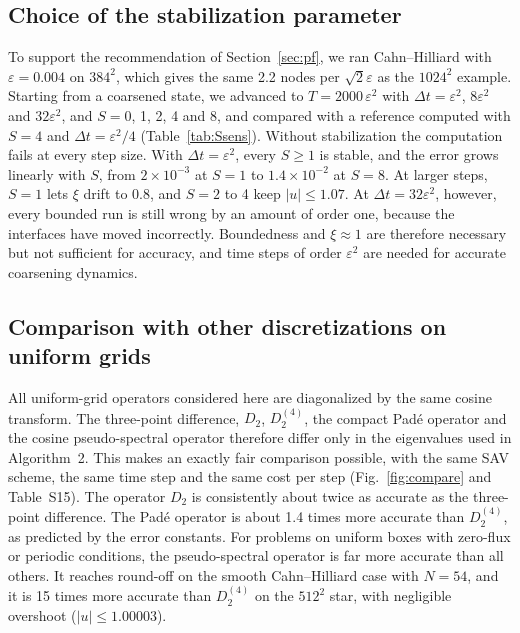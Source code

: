 \documentclass[preprint,12pt]{elsarticle}
\theoremstyle{remark}
\begin{document}
\subsection{Choice of the stabilization parameter}\label{sec:Sstudy}
To support the recommendation of Section~\ref{sec:pf}, we ran Cahn--Hilliard with $\varepsilon=0.004$ on
$384^2$, which gives the same 2.2 nodes per $\sqrt2\varepsilon$ as the $1024^2$ example. Starting from a
coarsened state, we advanced to $T=2000\,\varepsilon^2$ with $\Delta t=\varepsilon^2$, $8\varepsilon^2$ and
$32\varepsilon^2$, and $S=0$, 1, 2, 4 and 8, and compared with a reference computed with $S=4$ and
$\Delta t=\varepsilon^2/4$ (Table~\ref{tab:Ssens}). Without stabilization the computation fails at every step
size. With $\Delta t=\varepsilon^2$, every $S\ge1$ is stable, and the error grows linearly with $S$, from
$2\times10^{-3}$ at $S=1$ to $1.4\times10^{-2}$ at $S=8$. At larger steps, $S=1$ lets $\xi$ drift to 0.8, and
$S=2$ to 4 keep $|u|\le1.07$. At $\Delta t=32\varepsilon^2$, however, every bounded run is still wrong by an
amount of order one, because the interfaces have moved incorrectly. Boundedness and $\xi\approx1$ are
therefore necessary but not sufficient for accuracy, and time steps of order $\varepsilon^2$ are needed for
accurate coarsening dynamics.

\begin{table}[t]\centering\small
\caption{Sensitivity to the stabilization $S$ and the time step: largest $|u_h|$, error against the reference
at $T=2000\varepsilon^2$, and $\xi$ at $T$ ($\varepsilon=0.004$, $384^2$).}\label{tab:Ssens}

\end{table}

\subsection{Comparison with other discretizations on uniform grids}\label{sec:compare}
All uniform-grid operators considered here are diagonalized by the same cosine transform. The
three-point difference, $D_2$, $D_2^{(4)}$, the compact Pad\'e operator and the cosine pseudo-spectral
operator therefore differ only in the eigenvalues used in Algorithm~2. This makes an exactly fair
comparison possible, with the same SAV scheme, the same time step and the same cost per step
(Fig.~\ref{fig:compare} and Table~S15). The operator $D_2$ is consistently about twice as
accurate as the three-point difference. The Pad\'e operator is about 1.4 times more accurate than
$D_2^{(4)}$, as predicted by the error constants. For problems on uniform boxes with zero-flux or periodic
conditions, the pseudo-spectral operator is far more accurate than all others. It reaches round-off on the
smooth Cahn--Hilliard case with $N=54$, and it is 15 times more accurate than $D_2^{(4)}$ on the $512^2$
star, with negligible overshoot ($|u|\le1.00003$).
\end{document}
